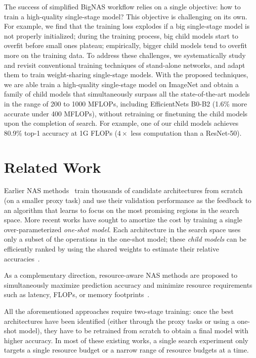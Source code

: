 \documentclass[runningheads]{llncs}
\begin{document}
The success of simplified BigNAS workflow relies on a single objective: how to train a high-quality single-stage model? This objective is challenging on its own. For example, we find that the training loss explodes if a big single-stage model is not properly initialized; during the training process, big child models start to overfit before small ones plateau; empirically, bigger child models tend to overfit more on the training data. To address these challenges, we systematically study and revisit conventional training techniques of stand-alone networks, and adapt them to train weight-sharing single-stage models. With the proposed techniques, we are able train a high-quality single-stage model on ImageNet and obtain a family of child models that simultaneously surpass all the state-of-the-art models in the range of 200 to 1000 MFLOPs, including EfficientNets B0-B2 (1.6\% more accurate under 400 MFLOPs), without retraining or finetuning the child models upon the completion of search. For example, one of our child models achieves 80.9\% top-1 accuracy at 1G FLOPs (\(4 \times\) less computation than a ResNet-50).
 
\section{Related Work}
Earlier NAS methods~\cite{zoph2016neural, zoph2018learning, liu2017hierarchical, liu2018progressive, real2018regularized} train thousands of candidate architectures from scratch (on a smaller proxy task) and use their validation performance as the feedback to an algorithm that learns to focus on the most promising regions in the search space. More recent works have sought to amortize the cost by training a single over-parameterized \emph{one-shot model}. Each architecture in the search space uses only a subset of the operations in the one-shot model; these \emph{child models} can be efficiently ranked by using the shared weights to estimate their relative accuracies~\cite{brock2018smash, pham2018efficient, bender2018understanding, liu2018darts, cai2018proxylessnas, wu2019fbnet, yu2019network, hu2020dsnas, Yang_2020_CVPR}.

As a complementary direction, resource-aware NAS methods are proposed to simultaneously maximize prediction accuracy and minimize resource requirements such as latency, FLOPs, or memory footprints~\cite{tan2018mnasnet, cai2019once, wu2019fbnet, stamoulis2019single, guo2019single, yu2019network, Berman_2020_CVPR}.

All the aforementioned approaches require two-stage training: once the best architectures have been identified (either through the proxy tasks or using a one-shot model), they have to be retrained from scratch to obtain a final model with higher accuracy. In most of these existing works, a single search experiment only targets a single resource budget or a narrow range of resource budgets at a time.
\end{document}
